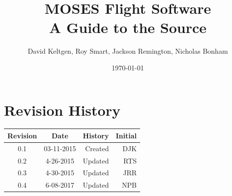 \documentclass[11pt,titlepage]{article}
\title{MOSES Flight Software \\ A Guide to the Source}
\author{David Keltgen, Roy Smart, Jackson Remington, Nicholas Bonham}
\date{\today}
\begin{document}
\maketitle
\tableofcontents
\newpage

\section[Revisions]{Revision History}
	\begin{longtable}{|c|c|r|r|}
		\hline
		Revision	&	Date	&	\multicolumn{1}{c|}{History}	&	\multicolumn{1}{c|}{Initial}\\
		\hline
		0.1	&	03-11-2015	&	Created	& DJK	\\
		\hline
		0.2 & 4-26-2015 & Updated & RTS \\
		\hline
		0.3 & 4-30-2015 & Updated & JRR \\
		\hline
		0.4	& 6-08-2017	& Updated & NPB  \\
		\hline

	\end{longtable}
	
\newpage
\end{document}
